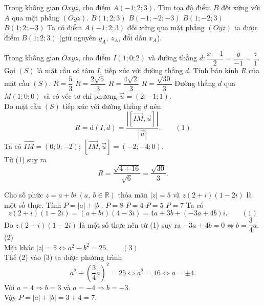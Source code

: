 \begin{ex}%
	Trong không gian $Oxyz$, cho điểm $A(-1;2;3)$. Tìm tọa độ điểm $B$ đối xứng với $A$ qua mặt phẳng $(Oyz)$.
	\choice
	{\True $B(1;2;3)$}
	{$B(-1;-2;-3)$}
	{$B(1;-2;3)$}
	{$B(1;2;-3)$}
	\loigiai
	{
		Ta có điểm $A(-1;2;3)$ đối xứng qua mặt phẳng $(Oyz)$ ta được điểm $B(1;2;3)$ (giữ nguyên $y_A,~z_A$, đổi dấu $x_A$).
	}
\end{ex}

\begin{ex}%
	Trong không gian $Oxyz$, cho điểm $I(1;0;2)$ và đường thẳng $d\colon\dfrac{x-1}{2}=\dfrac{y}{-1}=\dfrac{z}{1}$. Gọi $(S)$ là mặt cầu có tâm $I$, tiếp xúc với đường thẳng $d$. Tính bán kính $R$ của mặt cầu $(S)$.
	\choice
	{$R=\dfrac{5}{3}$}
	{$R=\dfrac{2\sqrt{5}}{3}$}
	{$R=\dfrac{4\sqrt{2}}{3}$}
	{\True $R=\dfrac{\sqrt{30}}{3}$}
	\loigiai
	{
		Đường thẳng $d$ qua $M(1;0;0)$ và có véc-tơ chỉ phương $\vec{u}=(2;-1;1)$.\\
		Do mặt cầu $(S)$ tiếp xúc với đường thẳng $d$ nên \[R=\mathrm{d}(I,d)=\dfrac{\left|\left[\vec{IM},\vec{u}\right]\right|}{|\vec{u}|}.\qquad(1)\]
		Ta có $\vec{IM}=(0;0;-2);~\left[\vec{IM},\vec{u}\right]=(-2;-4;0)$.\\
		Từ (1) suy ra \[R=\dfrac{\sqrt{4+16}}{\sqrt{6}}=\dfrac{\sqrt{30}}{3}.\]
	}
\end{ex}

\begin{ex}%
	Cho số phức $z=a+bi~(a,~b\in\mathbb{R})$ thỏa mãn $|z|=5$ và $z(2+i)(1-2i)$ là một số thực. Tính $P=|a|+|b|$.
	\choice
	{$P=8$}
	{$P=4$}
	{$P=5$}
	{\True $P=7$}
	\loigiai
	{
		Ta có
		\[z(2+i)(1-2i)=(a+bi)(4-3i)=4a+3b+(-3a+4b)i.\qquad(1)\]
		Do $z(2+i)(1-2i)$ là một số thực nên từ (1) suy ra $-3a+4b=0\Leftrightarrow b=\dfrac{3}{4}a$.\qquad(2)\\
		Mặt khác $|z|=5\Leftrightarrow a^2+b^2=25.\qquad(3)$\\
		Thế (2) vào (3) ta được phương trình 
		\[a^2+\left(\dfrac{3}{4}a\right)^2=25\Leftrightarrow a^2=16\Leftrightarrow a=\pm4.\]
		Với $a=4\Rightarrow b=3$ và $a=-4\Rightarrow b=-3$.\\
		Vậy $P=|a|+|b|=3+4=7$.
	}
\end{ex}

